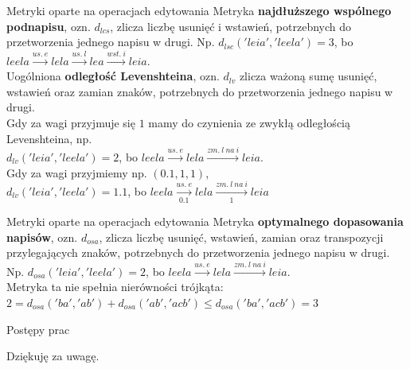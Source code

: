 \documentclass[11pt,pdftex,mathserif]{beamer}\usepackage[]{graphicx}\usepackage[]{color}
\theoremstyle{definition}
\begin{document}
\begin{frame}{Metryki oparte na operacjach edytowania}
Metryka \textbf{najdłuższego wspólnego podnapisu}, ozn. $d_{lcs}$, zlicza liczbę usunięć i wstawień, potrzebnych do przetworzenia jednego napisu w drugi. Np. $d_{lsc}('leia', 'leela') = 3$, bo $leela  \xrightarrow{us.\ e} lela  \xrightarrow{us.\ l} lea  \xrightarrow{wst.\ i} leia$.\\
\pause
Uogólniona \textbf{odległość Levenshteina}, ozn. $d_{lv}$ zlicza ważoną sumę usunięć, wstawień oraz zamian znaków, potrzebnych do przetworzenia jednego napisu w drugi. \\


\pause
Gdy za wagi przyjmuje się $1$ mamy do czynienia ze zwykłą odległością Levenshteina, np. \\
$d_{lv}('leia', 'leela') = 2$, bo $leela  \xrightarrow{us.\ e} lela  \xrightarrow{zm.\ l\ na\ i} leia$. \\
\pause
Gdy za wagi przyjmiemy np. $(0.1, 1, 1)$, \\
$d_{lv}('leia', 'leela') = 1.1$, bo $leela  \xrightarrow[0.1]{us.\ e} lela  \xrightarrow[1]{zm.\ l\ na\ i} leia$ 
\end{frame}



\begin{frame}{Metryki oparte na operacjach edytowania}
Metryka \textbf{optymalnego dopasowania napisów}, ozn. $d_{osa}$, zlicza liczbę usunięć, wstawień, zamian oraz transpozycji przylegających znaków, potrzebnych do przetworzenia jednego napisu w drugi. Np. $d_{osa}('leia', 'leela') = 2$, bo $leela  \xrightarrow{us.\ e} lela  \xrightarrow{zm.\ l\ na\ i} leia$. \\
\pause
Metryka ta nie spełnia nierówności trójkąta: $2 = d_{osa}('ba', 'ab') + d_{osa}('ab', 'acb') \leq d_{osa}('ba', 'acb') = 3$\\
\end{frame}

\begin{frame}{Postępy prac}

\end{frame}

% 
% 
% 
% 

\begin{frame}{}
   \begin{center}
      \Huge{Dziękuję za uwagę.}
   \end{center}
\end{frame}
\end{document}
